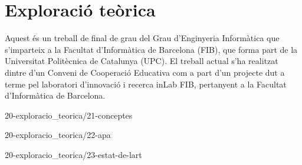\chapter{Exploració teòrica}

Aquest és un treball de final de grau del Grau d'Enginyeria Informàtica que s'imparteix a la Facultat d'Informàtica de Barcelona (FIB), que forma part de la Universitat Politècnica de Catalunya (UPC). El treball actual s'ha realitzat dintre d'un Conveni de Cooperació Educativa com a part d'un projecte dut a terme pel laboratori d'innovació i recerca inLab FIB, pertanyent a la Facultat d'Informàtica de Barcelona.

{20-exploracio_teorica/21-conceptes}

{20-exploracio_teorica/22-apa}

{20-exploracio_teorica/23-estat-de-lart}

\begin{comment}
2 Exploració teòrica
2.1 Conceptes generals
    2.1.1 Anàlisi d'un tiquet
    2.1. etc.
2.2 Aprenentatge autònom 
    2.2.1 Models en general
    2.2.2 Models NLP
2.3 Estat de l'art
    2.3.1 Aplicacions comercials
    2.3.2 Propostes descartades
    2.3.3 Comprovació models disponibles
    2.3.4 Models destacats
    2.3.5 Justificació de la tria
\end{comment}